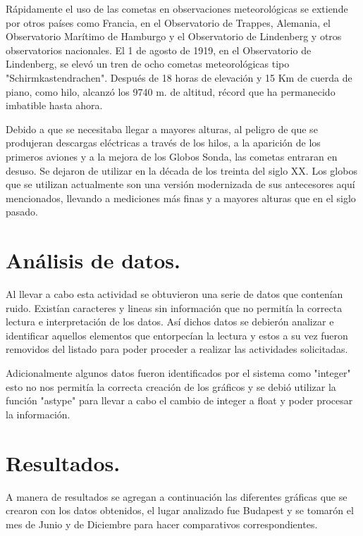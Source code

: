 \documentclass{article} %
\begin{document}
Rápidamente el uso de las cometas en observaciones meteorológicas se extiende por otros países como Francia, en el Observatorio de Trappes, Alemania, el Observatorio Marítimo de Hamburgo y el Observatorio de Lindenberg y otros observatorios nacionales. El 1 de agosto de 1919, en el Observatorio de Lindenberg, se elevó un tren de ocho cometas meteorológicas tipo "Schirmkastendrachen". Después de 18 horas de elevación y 15 Km de cuerda de piano, como hilo, alcanzó los 9740 m. de altitud, récord que ha permanecido imbatible hasta ahora.
\vspace{0.5 cm}

Debido a que se necesitaba llegar a mayores alturas, al peligro de que se produjeran descargas eléctricas a través de los hilos, a la aparición de los primeros aviones y a la mejora de los Globos Sonda, las cometas entraran en desuso. Se dejaron de utilizar en la década de los treinta del siglo XX. Los globos que se utilizan actualmente son una versión modernizada de sus antecesores aquí mencionados, llevando a mediciones más finas y a mayores alturas que en el siglo pasado. 


\section{Análisis de datos.}

Al llevar a cabo esta actividad se obtuvieron una serie de datos que contenían ruido. Existían caracteres y lineas sin información que no permitía la correcta lectura e interpretación de los datos. Así dichos datos se debierón analizar e identificar aquellos elementos que entorpecían la lectura y estos a su vez fueron removidos del listado para poder proceder a realizar las actividades solicitadas.
\vspace{0.5 cm}

Adicionalmente algunos datos fueron identificados por el sistema como "integer" esto no nos permitía la correcta creación de los gráficos y se debió utilizar la función "astype" para llevar a cabo el cambio de integer a float y poder procesar la información.

\section{Resultados.}

A manera de resultados se agregan a continuación las diferentes gráficas que se crearon con los datos obtenidos, el lugar analizado fue Budapest y se tomarón el mes de Junio y de Diciembre para hacer comparativos correspondientes. 
\vspace{0.5 cm}
\end{document}
